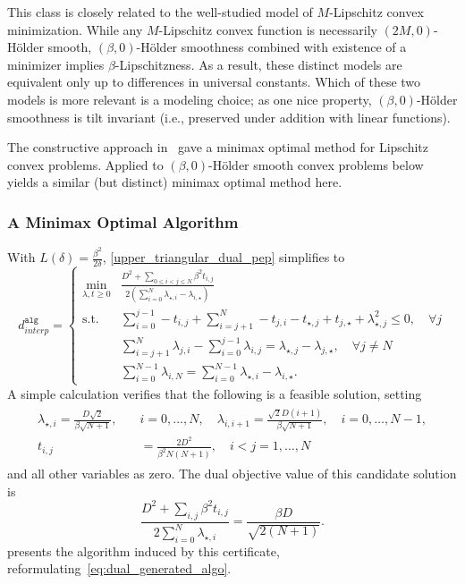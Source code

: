 \documentclass[11pt, hidelinks]{article}
\numberwithin{equation}{section}
\theoremstyle{thmstyletwo}%
\numberwithin{equation}{section}
\newcommand{\Holder}{H\"older }
\newcommand{\dAlg}{d^\mathtt{alg}}
\begin{document}
This class is closely related to the well-studied model of $M$-Lipschitz convex minimization. While any $M$-Lipschitz convex function is necessarily $(2M, 0)$-\Holder smooth, $(\beta,0)$-\Holder smoothness combined with existence of a minimizer implies $\beta$-Lipschitzness. As a result, these distinct models are equivalent only up to differences in universal constants. Which of these two models is more relevant is a modeling choice; as one nice property, $(\beta,0)$-\Holder smoothness is tilt invariant (i.e., preserved under addition with linear functions). 

The constructive approach in~\cite{constructive_approach} gave a minimax optimal method for Lipschitz convex problems. Applied to $(\beta,0)$-\Holder smooth convex problems below yields a similar (but distinct) minimax optimal method here. 

\subsubsection{A Minimax Optimal Algorithm}
With $L(\delta) = \frac{\beta^2}{2\delta}$, \eqref{upper_triangular_dual_pep} simplifies to
$$\dAlg_{interp} = \begin{cases} \min_{\lambda, t \geq 0} & \frac{D^2+\sum_{0\leq i<j\leq N}\beta^2 t_{i,j}}{2\left(\sum_{i=0}^N \lambda_{\star,i}-\lambda_{i,\star}\right)}\\
    \mathrm{s.t.}   & \sum_{i=0}^{j-1}  - t_{i,j}+ \sum_{i=j+1}^N -t_{j,i} - t_{\star,j} +t_{j,\star} + \lambda_{\star,j}^2 \leq 0, \quad  \forall j\\
    &  \sum_{i=j+1}^N \lambda_{j,i} -\sum_{i=0}^{j-1} \lambda_{i,j}  = \lambda_{\star,j} -\lambda_{j,\star}, \quad \forall j \ne N\\
    &
    \sum_{i=0}^{N-1}\lambda_{i,N} = \sum_{i=0}^{N-1}\lambda_{\star,i}-\lambda_{i,\star}.\end{cases}$$
A simple calculation verifies that the following is a feasible solution, setting
\begin{align}\label{eq:feasible_SSEP_dual_sol}
\begin{split}
    \lambda_{\star,i} = \frac{D\sqrt{2}}{\beta\sqrt{N+1}}, \quad &i = 0, \dots, N, \quad
    \lambda_{i,i+1} = \frac{\sqrt{2}D(i+1)}{\beta \sqrt{N+1}}, \quad i = 0, \dots, N-1,\\
    t_{i,j} &= \frac{2D^2}{\beta^2 N(N+1)}, \quad i < j = 1, \dots, N
    \end{split}
\end{align}
and all other variables as zero. The dual objective value of this candidate solution is
$$\frac{D^2+\sum_{i,j}\beta^2 t_{i,j}}{2\sum_{i=0}^N \lambda_{\star,i}} = \frac{\beta D}{\sqrt{2(N+1)}}.$$
 presents the algorithm induced by this certificate, reformulating~\eqref{eq:dual_generated_algo}.
\end{document}
